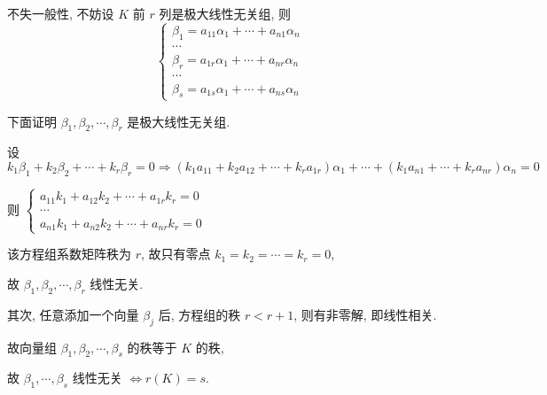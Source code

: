 		 不失一般性, 不妨设 \( K \) 前 \( r \) 列是极大线性无关组, 则
		 \[ \begin{cases} \beta_{1} = a_{11}\alpha_{1} + \cdots + a_{n1}\alpha_{n} \\ \cdots \\ \beta_{r} = a_{1r}\alpha_{1} + \cdots + a_{nr}\alpha_{n} \\ \cdots \\ \beta_{s} = a_{1s}\alpha_{1} + \cdots + a_{ns}\alpha_{n} \end{cases} \]

		 下面证明 \( \beta_{1}, \beta_{2}, \cdots, \beta_{r} \) 是极大线性无关组.

		 设 \( k_{1}\beta_{1} + k_{2}\beta_{2} + \cdots + k_{r}\beta_{r} = 0 \Rightarrow (k_{1}a_{11} + k_{2}a_{12} + \cdots + k_{r}a_{1r})\alpha_{1} + \cdots + (k_{1}a_{n1} + \cdots + k_{r}a_{nr})\alpha_{n} = 0 \)

		 则 \( \begin{cases} a_{11}k_{1} + a_{12}k_{2} + \cdots + a_{1r}k_{r} = 0 \\ \cdots \\ a_{n1}k_{1} + a_{n2}k_{2} + \cdots + a_{nr}k_{r} = 0 \end{cases} \)

		 该方程组系数矩阵秩为 \( r \), 故只有零点 \( k_{1}=k_{2}=\cdots=k_{r}=0 \),

		 故 \( \beta_{1}, \beta_{2}, \cdots, \beta_{r} \) 线性无关.

		 其次, 任意添加一个向量 \( \beta_{j} \) 后, 方程组的秩 \( r < r+1 \), 则有非零解, 即线性相关.

		 故向量组 \( \beta_{1}, \beta_{2}, \cdots, \beta_{s} \) 的秩等于 \( K \) 的秩,

		 故 \( \beta_{1}, \cdots, \beta_{s} \) 线性无关 \( \Leftrightarrow r(K)=s \).